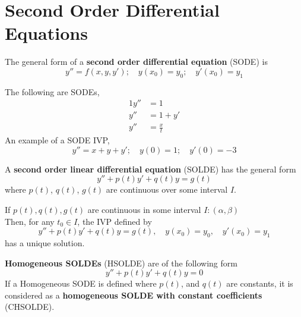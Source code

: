 \documentclass[diffeq.tex]{subfiles}
\begin{document}
\section{Second Order Differential Equations}
\begin{definition}
    The general form of a \textbf{second order differential equation} (SODE) is
    \begin{equation}
        y'' = f(x, y, y');\quad y(x_{0}) = y_{0};\quad y'(x_{0}) = y_{1}
    \end{equation}
\end{definition}
\np
\begin{example}
    The following are SODEs,
    \begin{alignat}{1}
        y'' &= 1\\
        y'' &= 1 + y'\\
        y'' &= \frac{x}{t}
    \end{alignat}
    An example of a SODE IVP,
    \begin{equation}
        y'' = x + y + y';\quad y(0) = 1;\quad y'(0) = -3
    \end{equation}
\end{example}
\begin{definition}
    A \textbf{second order linear differential equation} (SOLDE) has the general form
    \begin{equation}
        y'' + p(t)y' + q(t)y = g(t)
    \end{equation}
    where $p(t)$, $q(t)$, $g(t)$ are continuous over some interval $I$.
\end{definition}
\begin{btheorem}
    If $p(t), q(t), g(t)$ are continuous in some interval $I: (\alpha, \beta)$\\
    Then, for any $t_{0} \in I$, the IVP defined by
    \begin{equation}
        y'' + p(t)y' + q(t)y = g(t),\quad y(x_{0}) = y_{0},\quad y'(x_{0}) = y_{1}
    \end{equation}
    has a unique solution.
\end{btheorem}
\begin{definition}
    \textbf{Homogeneous SOLDEs} (HSOLDE) are of the following form
    \begin{equation}
        y'' + p(t)y' + q(t)y = 0
    \end{equation}
    If a Homogeneous SODE is defined where $p(t)$, and $q(t)$ are constants, it is considered as a \textbf{homogeneous SOLDE with constant coefficients} (CHSOLDE).
\end{definition}
\np
\end{document}
